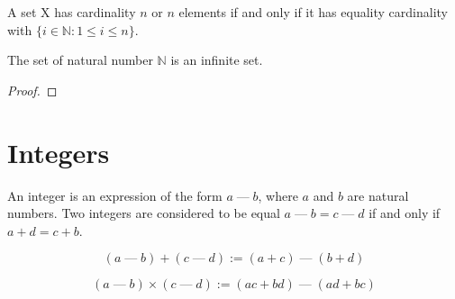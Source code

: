 \documentclass{blog}
\begin{document}
\begin{definition}[cardinality $n$]
  A set X has cardinality $n$ or $n$ elements if and only if it has equality cardinality with
  $\{i \in \mathbb{N}: 1 \leq i \leq n\}$.
\end{definition}

\begin{proposition}

\end{proposition}

\begin{definition}

\end{definition}

\begin{theorem}
  The set of natural number $\mathbb{N}$ is an infinite set.
\end{theorem}

\begin{proof}

\end{proof}

\begin{proposition}

\end{proposition}

\section{Integers}
\begin{definition}[$\mathbb{Z}$]
  An integer is an expression of the form $a \mathbin{\text{---}} b$,
  where $a$ and $b$ are natural numbers.
  Two integers are considered to be equal $a \mathbin{\text{---}} b = c \mathbin{\text{---}} d$
  if and only if $a + d = c + b$.
\end{definition}

\begin{definition}[sum]
  \begin{equation}
    (a \mathbin{\text{---}}  b) + (c \mathbin{\text{---}} d) := (a + c) \mathbin{\text{---}} (b + d)
  \end{equation}
\end{definition}

\begin{definition}[product]
  \begin{equation}
    (a \mathbin{\text{---}}  b) \times (c \mathbin{\text{---}} d) := (ac + bd) \mathbin{\text{---}} (ad + bc)
  \end{equation}
\end{definition}
\end{document}

